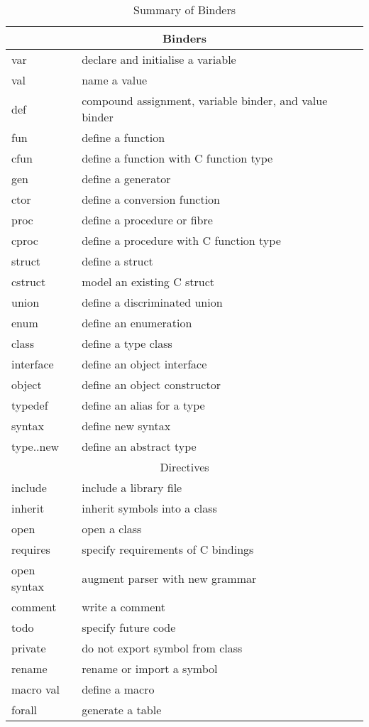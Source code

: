 \documentclass[oneside]{book}
\begin{document}
\begin{table}
\caption{Summary of Binders}
\label{Summary of Binders}
\begin{tabular}[c]{lll}
\multicolumn{3}{c}{Binders}\\
\hline
var&declare and initialise a variable\\
val&name a value\\
def&compound assignment, variable binder, and value binder\\
fun&define a function\\
cfun&define a function with C function type\\
gen&define a generator\\
ctor&define a conversion function\\
proc&define a procedure or fibre\\
cproc&define a procedure with C function type\\
struct&define a struct\\
cstruct&model an existing C struct\\
union&define a discriminated union\\
enum&define an enumeration\\
class&define a type class\\
interface&define an object interface\\
object&define an object constructor\\
typedef&define an alias for a type\\
syntax&define new syntax\\
type..new&define an abstract type\\
\multicolumn{3}{c}{Directives}\\
\hline
include&include a library file\\
inherit&inherit symbols into a class\\
open&open a class\\
requires&specify requirements of C bindings\\
open syntax&augment parser with new grammar\\
comment&write a comment\\
todo&specify future code\\
private&do not export symbol from class\\
rename&rename or import a symbol\\
macro val&define a macro\\
forall&generate a table\\
\end{tabular}
\end{table}
\end{document}
